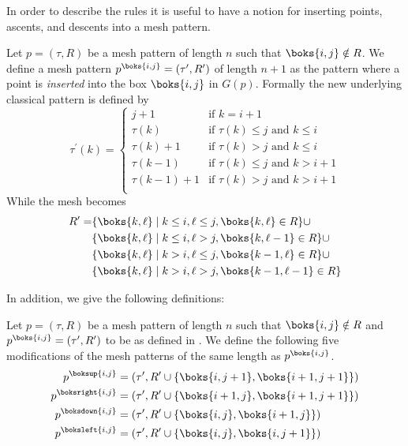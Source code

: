 In order to describe the rules it is useful to have a notion for inserting points, ascents, and descents
into a mesh pattern.
\begin{definition}
\label{def:ap}
Let \(p=(\tau,R)\) be a mesh pattern of length \(n\) such that \(\boks{i,j}\notin R\). We define
a mesh pattern \(p^\boks{i,j} = (\tau^\prime,R^\prime)\) of length \(n+1\) as the pattern where a 
point is \emph{inserted} into the box \(\boks{i,j}\) in \(G(p)\). Formally the new underlying classical
pattern is defined by 
\begin{equation*}
\tau^\prime(k) = \begin{cases}
    j+1 & \text{if } k = i+1\\
    \tau(k) & \text{if } \tau(k)\le j \text{ and }k\le i\\
    \tau(k)+1 & \text{if } \tau(k)> j \text{ and }k\le i\\
    \tau(k-1) & \text{if } \tau(k)\le j \text{ and }k> i+1\\
    \tau(k-1)+1 & \text{if } \tau(k)> j \text{ and }k> i+1\\
\end{cases} 
\end{equation*}
While the mesh becomes
\begin{equation*}
\begin{aligned}
R^\prime=&\{\boks{k,\ell}\mid k\le i, \ell\le j, \boks{k,\ell}\in R\} \cup\\
&\{\boks{k,\ell}\mid k\le i, \ell > j, \boks{k,\ell-1}\in R\}\cup\\
&\{\boks{k,\ell}\mid k > i, \ell \le j, \boks{k-1,\ell}\in R\}\cup\\
&\{\boks{k,\ell}\mid k > i, \ell > j, \boks{k-1,\ell-1}\in R\}\\
\end{aligned}
\end{equation*}
\end{definition}
In addition, we give the following definitions:
\begin{definition}
Let \(p=(\tau,R)\) be a mesh pattern of length \(n\) such that \(\boks{i,j}\notin R\) and 
\(p^\boks{i,j} = (\tau^\prime,R^\prime)\) to be as defined in . We define
the following five modifications of the mesh patterns of the same length as \(p^\boks{i,j}\). 
\begin{align*}
p^\boksup{i,j} &= (\tau^\prime, R^\prime \cup \{\boks{i,j+1},\boks{i+1,j+1}\})\\
p^\boksright{i,j} &= (\tau^\prime, R^\prime \cup \{\boks{i+1,j},\boks{i+1,j+1}\})\\
p^\boksdown{i,j} &= (\tau^\prime, R^\prime \cup \{\boks{i,j},\boks{i+1,j}\})\\
p^\boksleft{i,j} &= (\tau^\prime, R^\prime \cup \{\boks{i,j},\boks{i,j+1}\})\\
\end{align*}
\end{definition}
